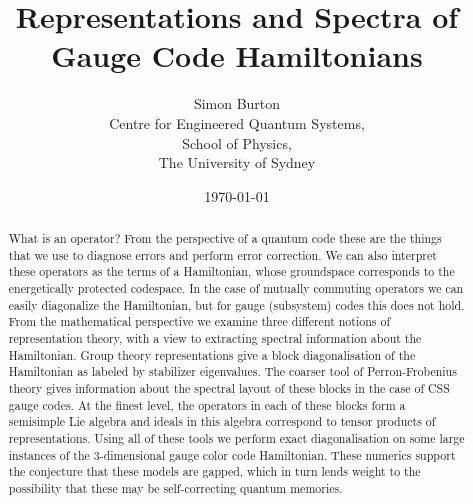 \documentclass[12pt]{article}
\begin{document}
\title{Representations and Spectra of Gauge Code Hamiltonians}

\author{Simon Burton\\
Centre for Engineered Quantum Systems,\\
School of Physics,\\
The University of Sydney}

\date{\today}


\maketitle

\begin{abstract}
What is an operator?
From the perspective of a quantum code these are the
things that we use to diagnose errors and perform error correction.
We can also interpret these operators as the terms of a Hamiltonian, whose
groundspace corresponds to the energetically protected codespace.
In the case of mutually commuting operators we can easily diagonalize the
Hamiltonian, but for gauge (subsystem) codes this does not hold.
From the mathematical perspective we examine three different notions of
representation theory, with a view to extracting
spectral information about the Hamiltonian.
Group theory representations give
a block diagonalisation of the Hamiltonian as labeled by stabilizer eigenvalues.
The coarser tool of Perron-Frobenius theory gives information about the
spectral layout of these blocks in the case of CSS gauge codes.
At the finest level, the operators in each of these blocks form a semisimple Lie
algebra and ideals in this algebra correspond to tensor products of
representations.
Using all of these tools we
perform exact diagonalisation on some
large instances of the 3-dimensional gauge color code Hamiltonian.
These numerics support the conjecture that these models are gapped,
which in turn lends weight to the possibility that these may
be self-correcting quantum memories.
\end{abstract}
\end{document}
